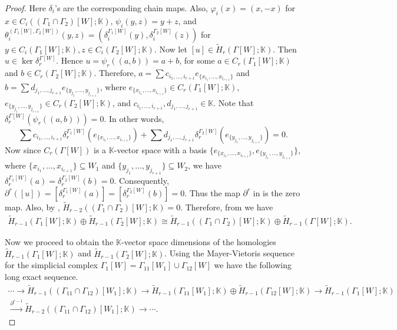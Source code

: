 \documentclass[12pt,reqno]{amsart}
\theoremstyle{definition}
\newcommand{\K}{\mathbb K}
\begin{document}
\begin{proof}
Here $\delta_i$'s are the corresponding chain maps. Also, $\varphi_i(x)=(x,-x)$ for $x\in C_i((\Gamma_1\cap\Gamma_2)[W];\K)$, $\psi_i(y,z)=y+z$, and $\theta_i^{(\Gamma_1[W],\Gamma_2[W])}(y,z)=(\delta_i^{\Gamma_1[W]}(y),\delta_i^{\Gamma_2[W]}(z))$ for $y\in C_i(\Gamma_1[W];\K), z\in C_i(\Gamma_2[W];\K)$. Now let $[u]\in \widetilde H_r(\Gamma[W];\K)$. Then $u\in \ker \delta_r^{\Gamma[W]}$. Hence $u=\psi_r((a,b))=a+b$, for some $a\in C_r(\Gamma_1[W];\K) $ and $b\in C_r(\Gamma_2[W];\K)$. Therefore, $a=\sum c_{i_1,\ldots,i_{r+1}}e_{\{x_{i_1},\ldots,x_{i_{r+1}}\}}$ and $b=\sum d_{j_1,\ldots,j_{r+1}}e_{\{y_{j_1},\ldots,y_{j_{r+1}}\}}$, where $e_{\{x_{i_1},\ldots,x_{i_{r+1}}\}}\in C_r(\Gamma_1[W];\K)$, $e_{\{y_{j_1},\ldots,y_{j_{r+1}}\}}\in C_r(\Gamma_2[W];\K)$, and $c_{i_1,\ldots,i_{r+1}},d_{j_1,\ldots,j_{r+1}}\in\K$. Note that $\delta_r^{\Gamma[W]}(\psi_r((a,b)))=0$. In other words, 
{\footnotesize
\[
\sum c_{i_1,\ldots,i_{r+1}}\delta_r^{\Gamma_1[W]}(e_{\{x_{i_1},\ldots,x_{i_{r+1}}\}})+\sum d_{j_1,\ldots,j_{r+1}}\delta_r^{\Gamma_2[W]}(e_{\{y_{j_1},\ldots,y_{j_{r+1}}\}})=0.
\]}
Now since $C_r(\Gamma[W])$ is a $\K$-vector space with a basis $\{e_{\{x_{i_1},\ldots,x_{i_{r+1}}\}},e_{\{y_{j_1},\ldots,y_{j_{r+1}}\}}\}$, where $\{x_{i_1},\ldots,x_{i_{r+1}}\}\subseteq W_1$ and $\{y_{j_1},\ldots,y_{j_{r+1}}\}\subseteq W_2$, we have $\delta_r^{\Gamma_1[W]}(a)=\delta_r^{\Gamma_2[W]}(b)=0$. Consequently, $\partial^r([u])=[\delta_r^{\Gamma_1[W]}(a)]=[\delta_r^{\Gamma_2[W]}(b)]=0$. Thus the map $\partial^r$ in  is the zero map. Also, by , $\widetilde H_{r-2}((\Gamma_1\cap\Gamma_2)[W];\K)=0$. Therefore, from  we have
{\footnotesize
\begin{align}\label{eq2}
    \widetilde H_{r-1}(\Gamma_1[W];\K)\oplus \widetilde H_{r-1}(\Gamma_2[W];\K)\cong \widetilde H_{r-1}((\Gamma_1\cap\Gamma_2)[W];\K)\oplus \widetilde H_{r-1}(\Gamma[W];\K).
\end{align}}

Now we proceed to obtain the $\K$-vector space dimensions of the homologies $\widetilde H_{r-1}(\Gamma_1[W];\K)$ and $\widetilde H_{r-1}(\Gamma_2[W];\K)$. Using the Mayer-Vietoris sequence for the simplicial complex $\Gamma_1[W]=\Gamma_{11}[W_1]\cup\Gamma_{12}[W]$ we have the following long exact sequence.
{\footnotesize
\begin{equation}\label{eq3}
    \begin{split}
        \cdots \rightarrow \widetilde H_{r-1}((\Gamma_{11}\cap\Gamma_{12})[W_1];\K)\rightarrow \widetilde H_{r-1}(\Gamma_{11}[W_1];\K)\oplus \widetilde H_{r-1}(\Gamma_{12}[W];\K)
        \rightarrow \widetilde H_{r-1}(\Gamma_1[W];\K)\\
        \xrightarrow{\partial^{r-1}} \widetilde H_{r-2}((\Gamma_{11}\cap\Gamma_{12})[W_1];\K)\rightarrow\cdots.
    \end{split}
    \end{equation}}


\end{proof}
\end{document}
